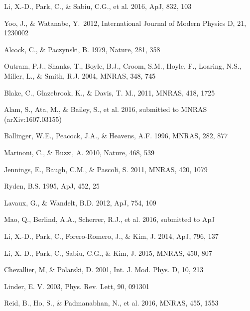 \documentclass[prl,twocolumn,superscriptaddress,aps,amsmath,amssymb,nofootinbib,altaffilletter]{revtex4}
\begin{document}
\begin{thebibliography}{}
Li, X.-D., Park, C., \& Sabiu, C.G., et al. 2016, ApJ, 832, 103

Yoo, J., \& Watanabe, Y.\ 2012, International Journal of Modern Physics D, 21, 1230002 

Alcock, C., \& Paczynski, B. 1979, Nature, 281, 358  

Outram, P.J., Shanks, T., Boyle, B.J., Croom, S.M., Hoyle, F., Loaring, N.S., 
Miller, L., \& Smith, R.J. 2004, MNRAS, 348, 745  

Blake, C., Glazebrook, K., \& Davis, T. M., 2011, MNRAS, 418, 1725  

Alam, S., Ata, M., \& Bailey, S., et al. 2016,
submitted to MNRAS (arXiv:1607.03155)

Ballinger, W.E., Peacock, J.A., \& Heavens, A.F. 1996, MNRAS, 282, 877  

Marinoni, C., \& Buzzi, A. 2010, Nature, 468, 539  

Jennings, E., Baugh, C.M., \& Pascoli, S. 2011, MNRAS, 420, 1079  

Ryden, B.S. 1995, ApJ, 452, 25  

Lavaux, G., \& Wandelt, B.D. 2012, ApJ, 754, 109  

Mao, Q., Berlind, A.A., Scherrer, R.J., et al. 2016, submitted to ApJ


Li, X.-D., Park, C., Forero-Romero, J., \& Kim, J. 2014, ApJ, 796, 137

Li, X.-D., Park, C., Sabiu, C.G., \& Kim, J. 2015, MNRAS, 450, 807 

Chevallier, M, \& Polarski, D. 2001, Int. J. Mod. Phys. D,  10, 213

Linder, E. V. 2003, Phys. Rev. Lett, 90, 091301

Reid, B., Ho, S., \& Padmanabhan, N., et al.  2016, MNRAS, 455, 1553


\end{thebibliography}
\end{document}
